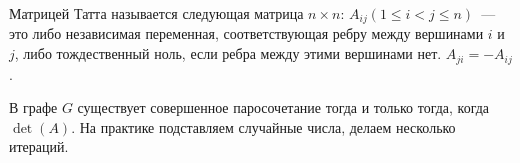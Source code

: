 Матрицей Татта называется следующая матрица $n \times n$: $A_{ij} (1 \le i < j \le n)$~--- это либо независимая переменная, соответствующая ребру между вершинами $i$ и $j$, либо тождественный ноль, если ребра между этими вершинами нет. $A_{ji} = -A_{ij}$ .

В графе $G$ существует совершенное паросочетание тогда и только тогда, когда $\det(A)$. На практике подставляем случайные числа, делаем несколько итераций.